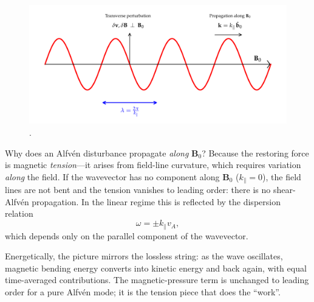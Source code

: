 \begin{figure}[t] 
\centering 
\includegraphics[width=\textwidth]{figures/alfven_diagram.pdf}
\caption{.} 
\label{fig:alfvenwave} 
\end{figure}

Why does an Alfvén disturbance propagate \emph{along} \(\mathbf B_0\)?
Because the restoring force is magnetic \emph{tension}—it arises from field-line curvature, which requires variation \emph{along} the field. If the wavevector has no component along \(\mathbf B_0\) (\(k_\parallel=0\)), the field lines are not bent and the tension vanishes to leading order: there is no shear-Alfvén propagation. In the linear regime this is reflected by the dispersion relation
\[
\omega=\pm k_\parallel v_A,
\]
which depends only on the parallel component of the wavevector.

Energetically, the picture mirrors the lossless string: as the wave oscillates, magnetic bending energy converts into kinetic energy and back again, with equal time-averaged contributions. The magnetic-pressure term is unchanged to leading order for a pure Alfvén mode; it is the tension piece that does the “work”.

